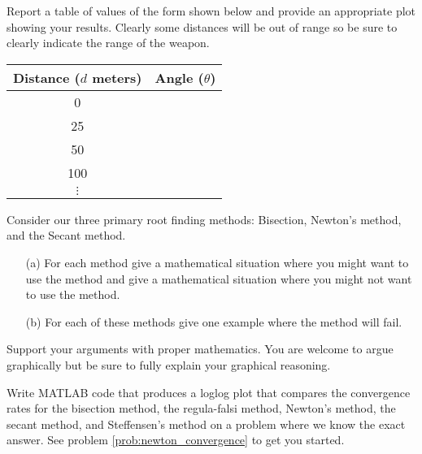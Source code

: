 \begin{problem}
\begin{enumerate}
            Report a table of values of the form shown below and provide an appropriate
            plot showing your results.  Clearly some distances will be out of range so be
            sure to clearly indicate the range of the weapon.
            \begin{center}
                \begin{tabular}{|c|c|}
                    \hline
                    Distance ($d$ meters) & Angle ($\theta$) \\ \hline \hline
                    0 & \\
                    25 & \\
                    50 & \\
                    100 & \\
                    $\vdots$ & \\ \hline
                \end{tabular}
            \end{center}
    \end{enumerate}
\end{problem}


\begin{problem}
    Consider our three primary root finding methods: Bisection, Newton's method, and the
    Secant method.  
    \begin{enumerate}
        \item[(a)] For each method give a mathematical situation where you might want to
            use the method and give a mathematical situation where you might not want to
            use the method.  
        \item[(b)] For each of these methods give one example where the method will fail.  
        \end{enumerate}
        Support your arguments with proper mathematics.  You are welcome to argue
        graphically but be sure to fully explain your graphical reasoning.
\end{problem}


\begin{problem}
    Write MATLAB code that produces a loglog plot that compares the convergence rates for
    the bisection method, the regula-falsi method, Newton's method, the secant method, and
    Steffensen's method on a problem where we know the exact answer. See problem
    \ref{prob:newton_convergence} to get you started.
\end{problem}




